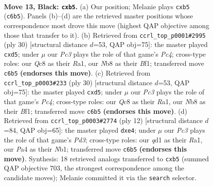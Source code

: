 \documentclass[11pt]{article}
\begin{document}
\clearpage

\begin{figure}[p]\centering
\begin{subfigure}{0.46\textwidth}\centering
\resizebox{\linewidth}{!}{%
\newchessgame
\chessboard[
  setfen={rnq1kb1r/p4pp1/2p1pn1p/1PP2b1P/p2P1P2/6N1/6P1/R1BQKBNR b KQkq - 0 13},
  showmover=false,
  pgfstyle=straightmove, color=movearrow, markmove={c6-b5}
]}
\caption{}
\end{subfigure}\hfill
\begin{subfigure}{0.46\textwidth}\centering
\resizebox{\linewidth}{!}{%
\newchessgame
\chessboard[
  setfen={1rbq1rk1/5pb1/p1p2np1/3p3p/2PBP2P/2N2P2/PP1Q2P1/R3KB1R w KQ - 0 16},
  showmover=false,
  pgfstyle=straightmove, color=movearrow, markmove={c4-d5}
]}
\caption{}
\end{subfigure}
\\[4pt]
\begin{subfigure}{0.46\textwidth}\centering
\resizebox{\linewidth}{!}{%
\newchessgame
\chessboard[
  setfen={1rbq1rk1/5pb1/p1p2np1/3p3p/2PBP2P/2N2P2/PP1Q2P1/R3KB1R w KQ - 0 16},
  showmover=false,
  pgfstyle=straightmove, color=movearrow, markmove={c4-d5}
]}
\caption{}
\end{subfigure}\hfill
\begin{subfigure}{0.46\textwidth}\centering
\resizebox{\linewidth}{!}{%
\newchessgame
\chessboard[
  setfen={rnbqkb1r/ppp2pp1/5n1p/8/2pNp3/3P2P1/PP2PPBP/RNBQK2R w KQkq - 0 7},
  showmover=false,
  pgfstyle=straightmove, color=movearrow, markmove={d3-e4}
]}
\caption{}
\end{subfigure}
\caption{\textbf{Move 13, Black: \texttt{cxb5}.} (a) Our position; Melanie plays \texttt{cxb5} (\texttt{c6b5}). Panels (b)--(d) are the retrieved master positions whose correspondence most drove this move (highest QAP objective among those that transfer to it). (b) Retrieved from \texttt{ccrl\_top\_p0001\#2995} (ply 30) [structural distance $d$=53, QAP obj=75]: the master played \texttt{cxd5}; under $\mu$ our \emph{Pc3} plays the role of that game's \emph{Pc4}; cross-type roles: our \emph{Q}c8 as their \emph{R}a1, our \emph{N}b8 as their \emph{B}f1; transferred move \texttt{c6b5} \textbf{(endorses this move)}. (c) Retrieved from \texttt{ccrl\_top\_p0003\#233} (ply 30) [structural distance $d$=53, QAP obj=75]: the master played \texttt{cxd5}; under $\mu$ our \emph{Pc3} plays the role of that game's \emph{Pc4}; cross-type roles: our \emph{Q}c8 as their \emph{R}a1, our \emph{N}b8 as their \emph{B}f1; transferred move \texttt{c6b5} \textbf{(endorses this move)}. (d) Retrieved from \texttt{ccrl\_top\_p0003\#2774} (ply 12) [structural distance $d$=84, QAP obj=65]: the master played \texttt{dxe4}; under $\mu$ our \emph{Pc3} plays the role of that game's \emph{Pd3}; cross-type roles: our \emph{q}d1 as their \emph{R}a1, our \emph{P}a4 as their \emph{N}b1; transferred move \texttt{c6b5} \textbf{(endorses this move)}. Synthesis: 18 retrieved analogs transferred to \texttt{cxb5} (summed QAP objective 703, the strongest correspondence among the candidate moves); Melanie committed it via the \texttt{search} selector.}
\label{fig:thought-m25}
\end{figure}
\end{document}
